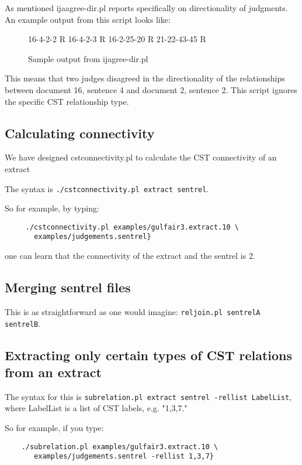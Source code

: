 \documentclass[10pt]{article}
\begin{document}
As mentioned ijaagree-dir.pl reports specifically on directionality of judgments.  
An example output from this script looks like:

\begin{figure}[htp!]
\centering
\begin{boxedverbatim}
16-4-2-2        R
16-4-2-3        R
16-2-25-20      R
21-22-43-45     R
\end{boxedverbatim}
\caption{Sample output from ijagree-dir.pl}
\label{figure:ijagree-dir.pl}
\end{figure}

This means that two judges disagreed in the directionality of the 
relationships between document 16, sentence 4 and document 2, sentence 2.  
This script ignores the specific CST relationship type.

\subsection{Calculating connectivity}
We have designed cstconnectivity.pl to calculate the CST connectivity of an extract 


The syntax is {\tt ./cstconnectivity.pl extract sentrel}.

So for example, by typing:
 
\begin{verbatim}
     ./cstconnectivity.pl examples/gulfair3.extract.10 \
       examples/judgements.sentrel}
\end{verbatim}

 one can learn that the connectivity of the extract and the sentrel is 2.

\subsection{Merging sentrel files}
This is as straightforward as one would imagine: {\tt reljoin.pl sentrelA sentrelB}.

\subsection{Extracting only certain types of CST relations from an extract}
The syntax for this is {\tt subrelation.pl extract sentrel -rellist LabelList}, 
where LabelList is a list of CST labels, e.g. "1,3,7."

So for example, if you type:
\begin{verbatim}
    ./subrelation.pl examples/gulfair3.extract.10 \
       examples/judgements.sentrel -rellist 1,3,7}
\end{verbatim}
\end{document}

